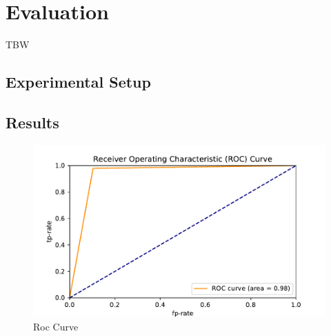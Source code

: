 

    
    


    
    
\chapter{Evaluation}\label{ch:evaluation}\glsresetall
TBW
\section{Experimental Setup}

\section{Results}




\begin{figure}
    \centering
    \includegraphics[width=\textwidth]{results/roc.pdf}
    \caption{Roc Curve}
    \label{fig:my_label}
\end{figure}
